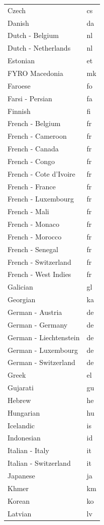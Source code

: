\documentclass[
  12pt,
]{krantz}
\begin{document}
\begin{longtable}[t]{ll}
Czech & cs\\
Danish & da\\
Dutch - Belgium & nl\\
\addlinespace
Dutch - Netherlands & nl\\
Estonian & et\\
FYRO Macedonia & mk\\
Faroese & fo\\
Farsi - Persian & fa\\
\addlinespace
Finnish & fi\\
French - Belgium & fr\\
French - Cameroon & fr\\
French - Canada & fr\\
French - Congo & fr\\
\addlinespace
French - Cote d'Ivoire & fr\\
French - France & fr\\
French - Luxembourg & fr\\
French - Mali & fr\\
French - Monaco & fr\\
\addlinespace
French - Morocco & fr\\
French - Senegal & fr\\
French - Switzerland & fr\\
French - West Indies & fr\\
Galician & gl\\
\addlinespace
Georgian & ka\\
German - Austria & de\\
German - Germany & de\\
German - Liechtenstein & de\\
German - Luxembourg & de\\
\addlinespace
German - Switzerland & de\\
Greek & el\\
Gujarati & gu\\
Hebrew & he\\
Hungarian & hu\\
\addlinespace
Icelandic & is\\
Indonesian & id\\
Italian - Italy & it\\
Italian - Switzerland & it\\
Japanese & ja\\
\addlinespace
Khmer & km\\
Korean & ko\\
Latvian & lv\\

\end{longtable}
\end{document}
